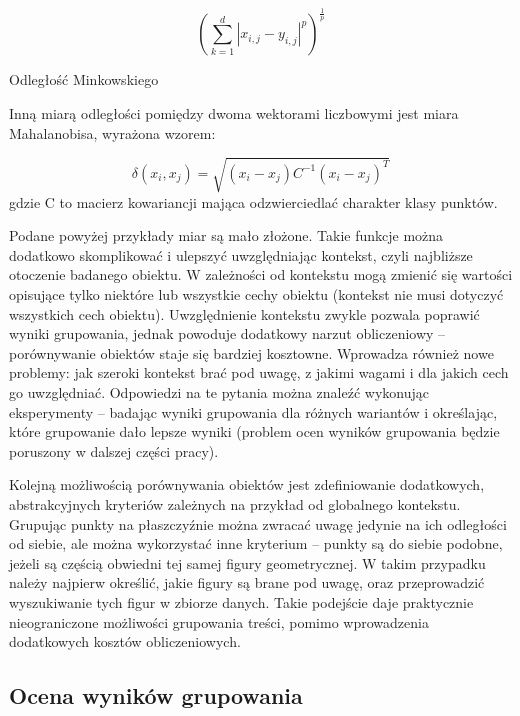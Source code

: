 \documentclass{article}
\begin{document}
\begin{maths}
	\centering
	\[(\sum_{k=1}^{d} |x_{i,j} - y_{i,j}|^p)^\frac{1}{p}\]
	\caption{Odległość Minkowskiego}
	\label{mth:minkowski}
\end{maths}


Inną miarą odległości pomiędzy dwoma wektorami liczbowymi jest miara Mahalanobisa, wyrażona wzorem:

\[\delta(x_{i}, x_{j}) = \sqrt{(x_{i} - x_{j})C^{-1}(x_{i} - x_{j})^T} \]
gdzie C to macierz kowariancji mająca odzwierciedlać charakter klasy punktów.

Podane powyżej przykłady miar są mało złożone. Takie funkcje można dodatkowo skomplikować i ulepszyć uwzględniając kontekst, czyli najbliższe otoczenie badanego obiektu. W zależności od kontekstu mogą zmienić się wartości opisujące tylko niektóre lub wszystkie cechy obiektu (kontekst nie musi dotyczyć wszystkich cech obiektu). Uwzględnienie kontekstu zwykle pozwala poprawić wyniki grupowania, jednak powoduje dodatkowy narzut obliczeniowy – porównywanie obiektów staje się bardziej kosztowne. Wprowadza również nowe problemy: jak szeroki kontekst brać pod uwagę, z jakimi wagami i dla jakich cech go uwzględniać. Odpowiedzi na te pytania można znaleźć wykonując eksperymenty – badając wyniki grupowania dla różnych wariantów i określając, które grupowanie dało lepsze wyniki (problem ocen wyników grupowania będzie poruszony w dalszej części pracy).

Kolejną możliwością porównywania obiektów jest zdefiniowanie dodatkowych, abstrakcyjnych kryteriów zależnych na przykład od globalnego kontekstu. Grupując punkty na płaszczyźnie można zwracać uwagę jedynie na ich odległości od siebie, ale można wykorzystać inne kryterium – punkty są do siebie podobne, jeżeli są częścią obwiedni tej samej figury geometrycznej. W takim przypadku należy najpierw określić, jakie figury są brane pod uwagę, oraz przeprowadzić wyszukiwanie tych figur w zbiorze danych. Takie podejście daje praktycznie nieograniczone możliwości grupowania treści, pomimo wprowadzenia dodatkowych kosztów obliczeniowych.

\subsection{Ocena wyników grupowania}
\end{document}
